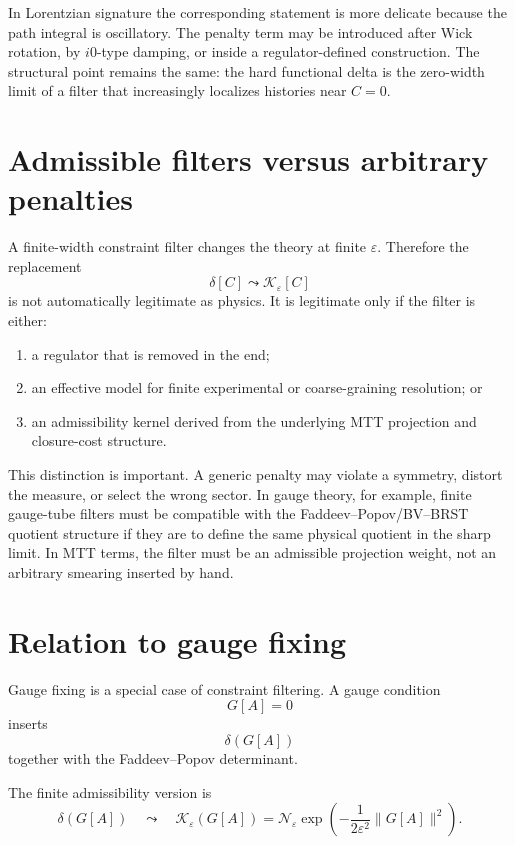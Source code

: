 \documentclass[11pt]{article}
\begin{document}
In Lorentzian signature the corresponding statement is more delicate because the path
integral is oscillatory.  The penalty term may be introduced after Wick rotation, by
\(i0\)-type damping, or inside a regulator-defined construction.  The structural point remains
the same: the hard functional delta is the zero-width limit of a filter that increasingly
localizes histories near \(C=0\).

\section{Admissible filters versus arbitrary penalties}

A finite-width constraint filter changes the theory at finite \(\varepsilon\).  Therefore the
replacement
\[
\delta[C]\leadsto \mathcal K_\varepsilon[C]
\]
is not automatically legitimate as physics.  It is legitimate only if the filter is either:

\begin{enumerate}
\item a regulator that is removed in the end;
\item an effective model for finite experimental or coarse-graining resolution; or
\item an admissibility kernel derived from the underlying MTT projection and closure-cost
structure.
\end{enumerate}

This distinction is important.  A generic penalty may violate a symmetry, distort the measure,
or select the wrong sector.  In gauge theory, for example, finite gauge-tube filters must be
compatible with the Faddeev--Popov/BV--BRST quotient structure if they are to define the
same physical quotient in the sharp limit.  In MTT terms, the filter must be an admissible
projection weight, not an arbitrary smearing inserted by hand.


\section{Relation to gauge fixing}

Gauge fixing is a special case of constraint filtering.  A gauge condition
\[
G[A]=0
\]
inserts
\[
\delta(G[A])
\]
together with the Faddeev--Popov determinant.

The finite admissibility version is
\[
\delta(G[A])
\quad\leadsto\quad
\mathcal K_\varepsilon(G[A])
=
\mathcal N_\varepsilon
\exp\!\left(-\frac{1}{2\varepsilon^2}\|G[A]\|^2\right).
\]
\end{document}

